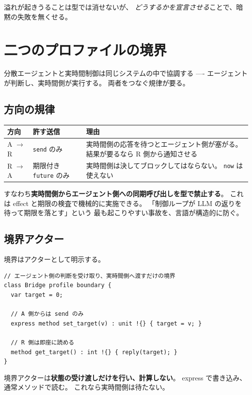 \documentclass[11pt,a4paper]{ltjsarticle}
\theoremstyle{remark}
\begin{document}
溢れが起きうることは型では消せないが、
\emph{どうするかを宣言させる}ことで、暗黙の失敗を無くせる。

\section{二つのプロファイルの境界}

分散エージェントと実時間制御は同じシステムの中で協調する
---- エージェントが判断し、実時間側が実行する。
両者をつなぐ規律が要る。

\subsection{方向の規律}

\begin{center}
\small
\begin{tabular}{@{}llp{6.0cm}@{}}
\toprule
方向 & 許す送信 & 理由 \\
\midrule
A $\to$ R & \texttt{send} のみ &
  実時間側の応答を待つとエージェント側が塞がる。
  結果が要るなら R 側から通知させる \\
R $\to$ A & 期限付き \texttt{future} のみ &
  実時間側は決してブロックしてはならない。
  \texttt{now} は使えない \\
\bottomrule
\end{tabular}
\end{center}

すなわち\textbf{実時間側からエージェント側への同期呼び出しを型で禁止する}。
これは effect と期限の検査で機械的に実施できる。
「制御ループが LLM の返りを待って期限を落とす」という
最も起こりやすい事故を、言語が構造的に防ぐ。

\subsection{境界アクター}

境界はアクターとして明示する。

\begin{lstlisting}[language=AIPL]
// エージェント側の判断を受け取り、実時間側へ渡すだけの境界
class Bridge profile boundary {
  var target = 0;

  // A 側からは send のみ
  express method set_target(v) : unit !{} { target = v; }

  // R 側は即座に読める
  method get_target() : int !{} { reply(target); }
}
\end{lstlisting}

境界アクターは\textbf{状態の受け渡しだけを行い、計算しない}。
express で書き込み、通常メソッドで読む。
これなら実時間側は待たない。
\end{document}
